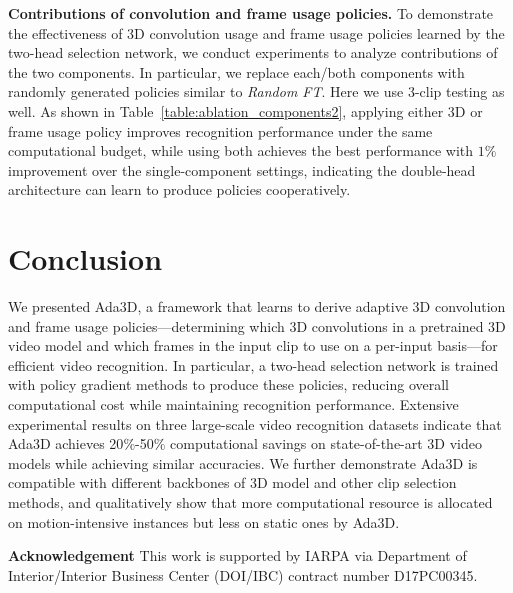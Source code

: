 \documentclass[final]{cvpr}
\newcommand{\system}{{Ada3D}\xspace}
\begin{document}
\vspace{-0.1in}
\noindent\textbf{Contributions of convolution and frame usage policies.} To demonstrate the effectiveness of 3D convolution usage and frame usage policies learned by the two-head selection network, we conduct experiments to analyze contributions of the two components. In particular, we replace each/both components with randomly generated policies similar to \emph{Random FT}. Here we use 3-clip testing as well. As shown in Table~\ref{table:ablation_components2}, applying either 3D or frame usage policy improves recognition performance under the same computational budget, while using both achieves the best performance with $1\%$ improvement over the single-component settings, indicating the double-head architecture can learn to produce policies cooperatively.



\section{Conclusion}
We presented \system, a framework that learns to derive adaptive 3D convolution and frame usage policies---determining which 3D convolutions in a pretrained 3D video model and which frames in the input clip to use on a per-input basis---for efficient video recognition. In particular, a two-head selection network is trained with policy gradient methods to produce these policies, reducing overall computational cost while maintaining recognition performance. Extensive experimental results on three large-scale video recognition datasets indicate that \system achieves 20$\%$-50$\%$ computational savings on state-of-the-art 3D video models while achieving similar accuracies. We further demonstrate \system is compatible with different backbones of 3D model and other clip selection methods, and qualitatively show that more computational resource is allocated on motion-intensive instances but less on static ones by \system.

\textbf{Acknowledgement} \small This work is supported by IARPA via Department of Interior/Interior Business Center (DOI/IBC) contract number D17PC00345.

{\small


}
\end{document}
